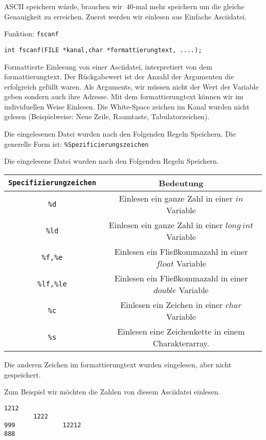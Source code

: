 ASCII speichern würde, brauchen wir $~40$-mal mehr speichern um die gleiche Genauigkeit zu erreichen. Zuerst 
werden wir einlesen aus Einfache Asciidatei.
\begin{myexampleblock}{Funktion: \texttt{fscanf}}
\begin{lstlisting}
int fscanf(FILE *kanal,char *formattierungtext, ....);
\end{lstlisting}
\vspace{-0.4cm}
Formattierte Einlesung von einer Asciidatei, interpretiert von dem formattierungtext. Der Rückgabewert ist der
Anzahl der Argumenten die erfolgreich gefüllt waren. Als Arguments, wir müssen nicht der Wert der Variable geben
sondern auch ihre Adresse. Mit dem formattierungtext können wir im individuellen Weise Einlesen.
Die White-Space zeichen im Kanal wurden nicht gelesen (Beispielweise: Neue Zeile, Raumtaste, Tabulatorzeichen).

Die eingelesenen Datei wurden nach den Folgenden Regeln Speichern. Die generelle Form ist:
\texttt{\%Spezificierungszeichen}

Die eingelesene Datei wurden nach den Folgenden Regeln Speichern. 

\begin{center}
\begin{tabular}{|cc|}
\hline
\texttt{Specifizierungzeichen} & Bedeutung \\\hline
\texttt{\%d}	&  Einlesen ein ganze Zahl in einer $in$ Variable \\
\texttt{\%ld}  &  Einlesen ein ganze Zahl in einer $long~int$ Variable \\
\texttt{\%f,\%e}   & Einlesen ein Fließkommazahl in einer $float$ Variable \\
\texttt{\%lf,\%le}  & Einlesen ein Fließkommazahl in einer $double$ Variable \\
\texttt{\%c}  & Einlesen ein Zeichen in einer $char$ Variable \\
\texttt{\%s}  & Einlesen eine Zeichenkette in einem Charakterarray.\\
\hline
\end{tabular}
\end{center}

Die anderen Zeichen im formattierungtext wurden eingelesen, aber nicht gespeichert. 
\end{myexampleblock}
Zum Beispiel wir möchten die Zahlen von diesem Asciidatei einlesen.
\begin{lstlisting}
1212
        1222
999             12212
888
\end{lstlisting}

